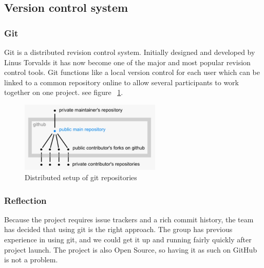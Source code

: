 \newpage
\subsection{Version control system}

\subsubsection{Git}
Git is a distributed revision control system. Initially designed and developed by Linus Torvalds 
it has now become one of the major and most popular revision control tools.
Git functions like a local version control for each user which can be linked to a common repository 
online to allow several participants to work together on one project. see figure ~\ref{fig:github}.

\begin{figure}[htb]
	\centering
	\includegraphics[width=0.6\textwidth]{process/github.jpg}
	\caption{Distributed setup of git repositories\cite{git:repositories}}
	\label{fig:github}
\end{figure}

\subsubsection{Reflection}
Because the project requires issue trackers and a rich commit history, the team has decided that using git is the right approach. The group has previous experience in using git, and we could get it up and running fairly quickly after project launch. The project is also Open Source, so having it as such on GitHub is not a problem.

